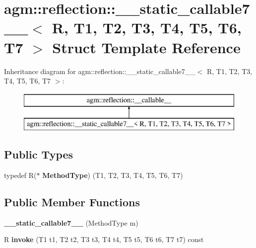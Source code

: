 \hypertarget{structagm_1_1reflection_1_1____static__callable7____}{}\section{agm\+:\+:reflection\+:\+:\+\_\+\+\_\+static\+\_\+callable7\+\_\+\+\_\+$<$ R, T1, T2, T3, T4, T5, T6, T7 $>$ Struct Template Reference}
\label{structagm_1_1reflection_1_1____static__callable7____}
Inheritance diagram for agm\+:\+:reflection\+:\+:\+\_\+\+\_\+static\+\_\+callable7\+\_\+\+\_\+$<$ R, T1, T2, T3, T4, T5, T6, T7 $>$\+:\begin{figure}[H]
\begin{center}
\leavevmode
\includegraphics[height=2.000000cm]{structagm_1_1reflection_1_1____static__callable7____}
\end{center}
\end{figure}
\subsection*{Public Types}
\begin{DoxyCompactItemize}
\item 
typedef R($\ast$ {\bfseries Method\+Type}) (T1, T2, T3, T4, T5, T6, T7)\hypertarget{structagm_1_1reflection_1_1____static__callable7_____ad73c2e0c71aac91fd8b474681648c885}{}\label{structagm_1_1reflection_1_1____static__callable7_____ad73c2e0c71aac91fd8b474681648c885}

\end{DoxyCompactItemize}
\subsection*{Public Member Functions}
\begin{DoxyCompactItemize}
\item 
{\bfseries \+\_\+\+\_\+static\+\_\+callable7\+\_\+\+\_\+} (Method\+Type m)\hypertarget{structagm_1_1reflection_1_1____static__callable7_____ab39c992ad52e74c4269d117aeefb57de}{}\label{structagm_1_1reflection_1_1____static__callable7_____ab39c992ad52e74c4269d117aeefb57de}

\item 
R {\bfseries invoke} (T1 t1, T2 t2, T3 t3, T4 t4, T5 t5, T6 t6, T7 t7) const \hypertarget{structagm_1_1reflection_1_1____static__callable7_____a65fe48aec7b7eaddc411080628fadfe2}{}\label{structagm_1_1reflection_1_1____static__callable7_____a65fe48aec7b7eaddc411080628fadfe2}

\end{DoxyCompactItemize}
